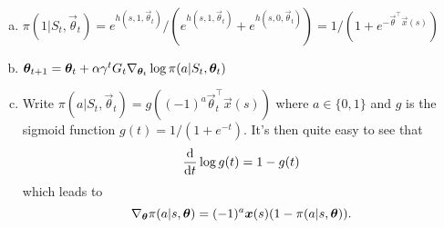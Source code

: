 \begin{enumerate}[a)]
    \item $\pi(1 \vert{} S_t, \vec{\theta}_t) = e^{h(s, 1, \vec{\theta}_t)} / (e^{h(s, 1, \vec{\theta}_t)} + e^{h(s, 0, \vec{\theta}_t)}) = 1 /(1 + e^{-\vec{\theta}^\top\vec{x}(s)}) $
    \item $\boldsymbol{\theta}_{t+1} = \boldsymbol{\theta}_t + \alpha \gamma^t G_t \nabla_{\boldsymbol{\theta}_t}\log\pi(a \vert{} S_t, \boldsymbol{\theta}_t)$ 
    \item Write $\pi(a \vert{} S_t, \vec{\theta}_t) = g((-1)^a \vec{\theta}_t^\top\vec{x}(s))$ where $a \in \{ 0, 1\}$ and $g$ is the sigmoid function $g(t) = 1 / (1 + e^{-t})$. It's then quite easy to see that 
    \[
        \frac{\mathrm{d}{}}{\mathrm{d}{} t} \log g(t) = 1 - g(t)
    \]
    which leads to
    \[
        \nabla_{\boldsymbol{\theta}} \pi(a \vert{} s, \boldsymbol{\theta}) = (-1)^a \boldsymbol{x}(s) (1 - \pi(a \vert{} s, \boldsymbol{\theta})).
    \]
\end{enumerate}